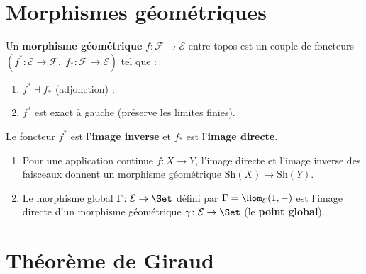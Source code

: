 \section{Morphismes géométriques}\label{sec:morphismes-geometriques}

\begin{definition}\label{def:morphisme-geometrique}
Un \textbf{morphisme géométrique} $f \colon \mathcal{F} \to \mathcal{E}$
entre topos est un couple de foncteurs
$(f^* \colon \mathcal{E} \to \mathcal{F},\;
  f_* \colon \mathcal{F} \to \mathcal{E})$
tel que :
\begin{enumerate}[label=(\roman*)]
\item $f^* \dashv f_*$ (adjonction) ;
\item $f^*$ est exact à gauche (préserve les limites finies).
\end{enumerate}
Le foncteur $f^*$ est l'\textbf{image inverse} et $f_*$ est
l'\textbf{image directe}.
\end{definition}

\begin{exemple}\label{ex:morphismes-geo}
\begin{enumerate}[label=(\roman*)]
\item Pour une application continue $f \colon X \to Y$,
      l'image directe et l'image inverse des faisceaux donnent
      un morphisme géométrique $\mathrm{Sh}(X) \to \mathrm{Sh}(Y)$.
\item Le morphisme global $\Gamma \colon \mathcal{E} \to \Set$
      défini par $\Gamma = \Hom_\mathcal{E}(1, -)$ est l'image
      directe d'un morphisme géométrique
      $\gamma \colon \mathcal{E} \to \Set$
      (le \textbf{point global}).
\end{enumerate}
\end{exemple}

\section{Théorème de Giraud}\label{sec:giraud}

